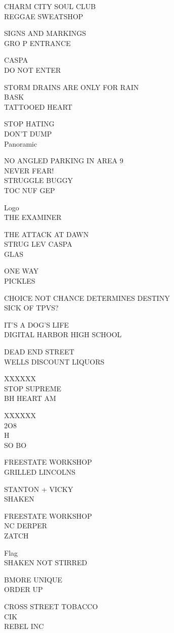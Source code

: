 \documentclass[10pt,letterpaper]{article}
\begin{document}
CHARM CITY SOUL CLUB\\
REGGAE SWEATSHOP

SIGNS AND MARKINGS\\
GRO P ENTRANCE

CASPA\\
DO NOT ENTER

STORM DRAINS ARE ONLY FOR RAIN\\
BASK\\
TATTOOED HEART

STOP HATING\\
DON'T DUMP\\
Panoramic

NO ANGLED PARKING IN AREA 9\\
NEVER FEAR!\\
STRUGGLE BUGGY\\
TOC NUF GEP

Logo\\
THE EXAMINER

THE ATTACK AT DAWN\\
STRUG LEV CASPA\\
GLAS

ONE WAY\\
PICKLES

CHOICE NOT CHANCE DETERMINES DESTINY\\
SICK OF TPVS?

IT'S A DOG'S LIFE\\
DIGITAL HARBOR HIGH SCHOOL

DEAD END STREET\\
WELLS DISCOUNT LIQUORS

XXXXXX\\
STOP SUPREME\\
BH HEART AM

XXXXXX\\
2O8\\
H\\
SO BO

FREESTATE WORKSHOP\\
GRILLED LINCOLNS

STANTON + VICKY\\
SHAKEN

FREESTATE WORKSHOP\\
NC DERPER\\
ZATCH

Flag\\
SHAKEN NOT STIRRED

BMORE UNIQUE\\
ORDER UP

CROSS STREET TOBACCO\\
CIK\\
REBEL INC
\end{document}
